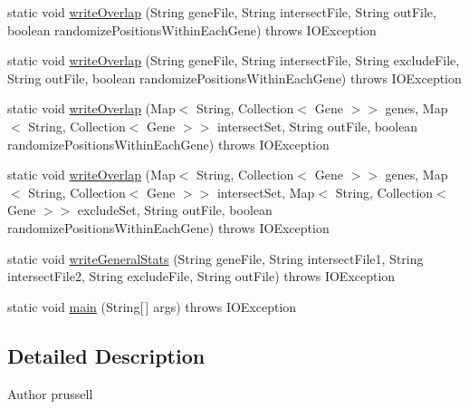 \begin{DoxyCompactItemize}
\item 
static void \hyperlink{classbroad_1_1core_1_1overlaputils_1_1_gene_set_intersect_a61ad48b4e324f1fc9620ab3718fe469e}{write\+Overlap} (String gene\+File, String intersect\+File, String out\+File, boolean randomize\+Positions\+Within\+Each\+Gene)  throws I\+O\+Exception 
\item 
static void \hyperlink{classbroad_1_1core_1_1overlaputils_1_1_gene_set_intersect_a788f9d9f0f1bd9353eb23d57722ed91c}{write\+Overlap} (String gene\+File, String intersect\+File, String exclude\+File, String out\+File, boolean randomize\+Positions\+Within\+Each\+Gene)  throws I\+O\+Exception 
\item 
static void \hyperlink{classbroad_1_1core_1_1overlaputils_1_1_gene_set_intersect_af88440b2a81ec8dd109eead3456d0d7c}{write\+Overlap} (Map$<$ String, Collection$<$ Gene $>$$>$ genes, Map$<$ String, Collection$<$ Gene $>$$>$ intersect\+Set, String out\+File, boolean randomize\+Positions\+Within\+Each\+Gene)  throws I\+O\+Exception 
\item 
static void \hyperlink{classbroad_1_1core_1_1overlaputils_1_1_gene_set_intersect_a5910a1ac4f471d727490c1b3ae1d849c}{write\+Overlap} (Map$<$ String, Collection$<$ Gene $>$$>$ genes, Map$<$ String, Collection$<$ Gene $>$$>$ intersect\+Set, Map$<$ String, Collection$<$ Gene $>$$>$ exclude\+Set, String out\+File, boolean randomize\+Positions\+Within\+Each\+Gene)  throws I\+O\+Exception 
\item 
static void \hyperlink{classbroad_1_1core_1_1overlaputils_1_1_gene_set_intersect_aa8943bc443c29e9d8ea16802818cdf0a}{write\+General\+Stats} (String gene\+File, String intersect\+File1, String intersect\+File2, String exclude\+File, String out\+File)  throws I\+O\+Exception 
\item 
static void \hyperlink{classbroad_1_1core_1_1overlaputils_1_1_gene_set_intersect_a033cf8b0d21c5945f316db8edbf9d1e7}{main} (String\mbox{[}$\,$\mbox{]} args)  throws I\+O\+Exception 
\end{DoxyCompactItemize}


\subsection{Detailed Description}
\begin{DoxyAuthor}{Author}
prussell 
\end{DoxyAuthor}


